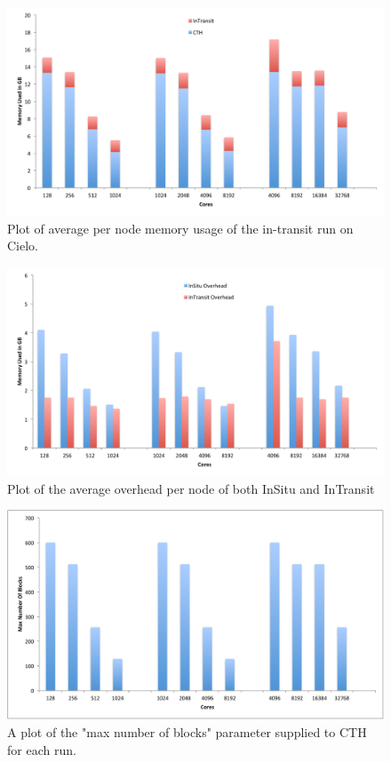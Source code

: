 \begin{figure}[htb]
  \centering
  \includegraphics[width=\linewidth]{figures/MemoryUsageInTransitPerNode.pdf}
  \caption{Plot of average per node memory usage of the in-transit run on Cielo.}
  \label{fig:MemoryInTransitPerNode}
\end{figure}

\begin{figure}[htb]
  \centering
  \includegraphics[width=\linewidth]{figures/MemoryUsageCompare.pdf}
  \caption{Plot of the average overhead per node of both InSitu and InTransit}
  \label{fig:MemoryCompare}
\end{figure}

\begin{figure}[htb]
  \centering
  \includegraphics[width=\linewidth]{figures/MaxNumberOfBlocks.pdf}
  \caption{A plot of the "max number of blocks" parameter supplied to CTH for each run.}
  \label{fig:MaxBlocks}
\end{figure}


